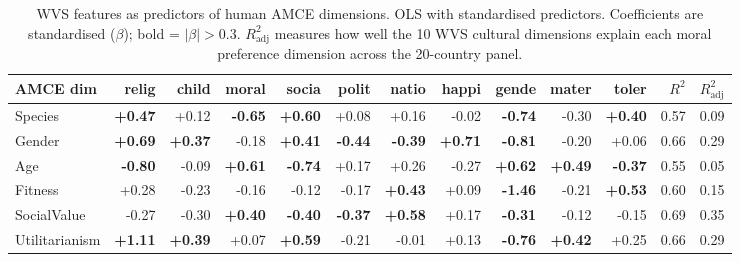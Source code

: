 \documentclass{article}
\begin{document}
\begin{table}[H]\centering\scriptsize
\caption{WVS features as predictors of human AMCE dimensions. OLS with standardised predictors. Coefficients are standardised ($\beta$); bold = $|\beta| > 0.3$. $R^2_{\text{adj}}$ measures how well the 10 WVS cultural dimensions explain each moral preference dimension across the 20-country panel.}
\label{tab:wvs_amce_regression}
\setlength{\tabcolsep}{3pt}
\begin{tabular}{lrrrrrrrrrrrr}\toprule
AMCE dim & relig & child & moral & socia & polit & natio & happi & gende & mater & toler & $R^2$ & $R^2_{\text{adj}}$ \\\midrule
Species & \textbf{+0.47} & +0.12 & \textbf{-0.65} & \textbf{+0.60} & +0.08 & +0.16 & -0.02 & \textbf{-0.74} & -0.30 & \textbf{+0.40} & 0.57 & 0.09 \\
Gender & \textbf{+0.69} & \textbf{+0.37} & -0.18 & \textbf{+0.41} & \textbf{-0.44} & \textbf{-0.39} & \textbf{+0.71} & \textbf{-0.81} & -0.20 & +0.06 & 0.66 & 0.29 \\
Age & \textbf{-0.80} & -0.09 & \textbf{+0.61} & \textbf{-0.74} & +0.17 & +0.26 & -0.27 & \textbf{+0.62} & \textbf{+0.49} & \textbf{-0.37} & 0.55 & 0.05 \\
Fitness & +0.28 & -0.23 & -0.16 & -0.12 & -0.17 & \textbf{+0.43} & +0.09 & \textbf{-1.46} & -0.21 & \textbf{+0.53} & 0.60 & 0.15 \\
SocialValue & -0.27 & -0.30 & \textbf{+0.40} & \textbf{-0.40} & \textbf{-0.37} & \textbf{+0.58} & +0.17 & \textbf{-0.31} & -0.12 & -0.15 & 0.69 & 0.35 \\
Utilitarianism & \textbf{+1.11} & \textbf{+0.39} & +0.07 & \textbf{+0.59} & -0.21 & -0.01 & +0.13 & \textbf{-0.76} & \textbf{+0.42} & +0.25 & 0.66 & 0.29 \\
\bottomrule
\end{tabular}
\end{table}
\end{document}
